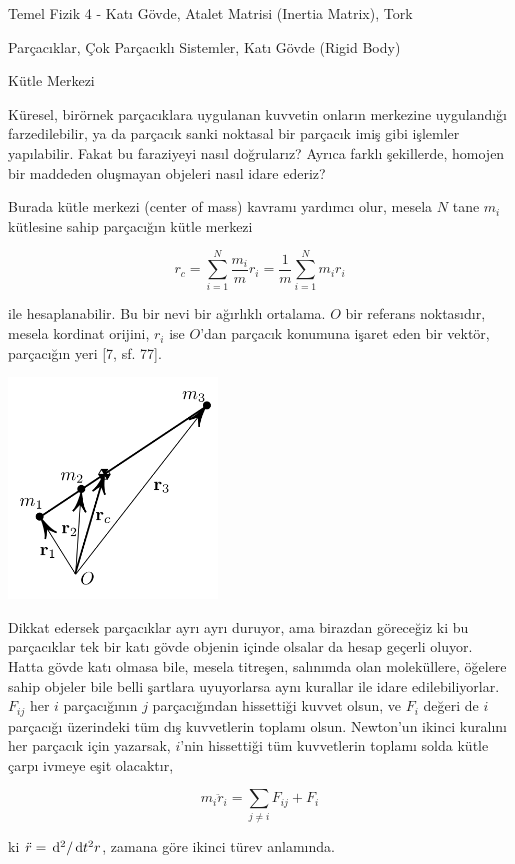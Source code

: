 \documentclass[12pt,fleqn]{article}\usepackage{../../common}
\begin{document}
Temel Fizik 4 - Katı Gövde, Atalet Matrisi (Inertia Matrix), Tork

Parçacıklar, Çok Parçacıklı Sistemler, Katı Gövde (Rigid Body)

Kütle Merkezi

Küresel, birörnek parçacıklara uygulanan kuvvetin onların merkezine uygulandığı
farzedilebilir, ya da parçacık sanki noktasal bir parçacık imiş gibi işlemler
yapılabilir. Fakat bu faraziyeyi nasıl doğrularız? Ayrıca farklı şekillerde,
homojen bir maddeden oluşmayan objeleri nasıl idare ederiz?

Burada kütle merkezi (center of mass) kavramı yardımcı olur, mesela $N$ tane
$m_i$ kütlesine sahip parçacığın kütle merkezi

$$
r_c =
\sum_{i=1}^{N} \frac{m_i}{m} r_i =
\frac{1}{m} \sum_{i=1}^{N} m_i r_i
$$

ile hesaplanabilir. Bu bir nevi bir ağırlıklı ortalama. $O$ bir referans
noktasıdır, mesela kordinat orijini, $r_i$ ise $O$'dan parçacık konumuna işaret
eden bir vektör, parçacığın yeri [7, sf. 77].

\includegraphics[width=15em]{phy_005_basics_08.png}

Dikkat edersek parçacıklar ayrı ayrı duruyor, ama birazdan göreceğiz ki bu
parçacıklar tek bir katı gövde objenin içinde olsalar da hesap geçerli
oluyor. Hatta gövde katı olmasa bile, mesela titreşen, salınımda olan
moleküllere, öğelere sahip objeler bile belli şartlara uyuyorlarsa aynı kurallar
ile idare edilebiliyorlar. $F_{ij}$ her $i$ parçacığının $j$ parçacığından
hissettiği kuvvet olsun, ve $F_i$ değeri de $i$ parçacığı üzerindeki tüm dış
kuvvetlerin toplamı olsun. Newton'un ikinci kuralını her parçacık için yazarsak,
$i$'nin hissettiği tüm kuvvetlerin toplamı solda kütle çarpı ivmeye eşit
olacaktır,

$$
m_i \ddot{r}_i = \sum_{j \ne i} F_{ij} + F_i
$$

ki $\ddot{r} = \,\mathrm{d}^2 / \,\mathrm{d} t^2 r$, zamana göre ikinci türev anlamında.
\end{document}

